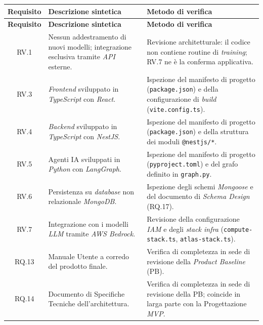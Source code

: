 \documentclass[12pt, a4paper]{article}
\begin{document}
\renewcommand{\arraystretch}{1.3}
\begin{xltabular}{\textwidth}{|c|X|X|}

    \hline
    \textbf{Requisito} & \textbf{Descrizione sintetica} & \textbf{Metodo di verifica} \\ \hline
    \endfirsthead

    \hline
    \textbf{Requisito} & \textbf{Descrizione sintetica} & \textbf{Metodo di verifica} \\ \hline
    \endhead

    RV.1 & Nessun addestramento di nuovi modelli; integrazione esclusiva tramite \textit{API} esterne. & Revisione architetturale: il codice non contiene routine di \textit{training}; RV.7 ne è la conferma applicativa. \\ \hline

    RV.3 & \textit{Frontend} sviluppato in \textit{TypeScript} con \textit{React}. & Ispezione del manifesto di progetto (\texttt{package.json}) e della configurazione di \textit{build} (\texttt{vite.config.ts}). \\ \hline

    RV.4 & \textit{Backend} sviluppato in \textit{TypeScript} con \textit{NestJS}. & Ispezione del manifesto di progetto (\texttt{package.json}) e della struttura dei moduli \texttt{@nestjs/*}. \\ \hline

    RV.5 & Agenti IA sviluppati in \textit{Python} con \textit{LangGraph}. & Ispezione del manifesto di progetto (\texttt{pyproject.toml}) e del grafo definito in \texttt{graph.py}. \\ \hline

    RV.6 & Persistenza su \textit{database} non relazionale \textit{MongoDB}. & Ispezione degli schemi \textit{Mongoose} e del documento di \textit{Schema Design} (RQ.17). \\ \hline

    RV.7 & Integrazione con i modelli \textit{LLM} tramite \textit{AWS Bedrock}. & Revisione della configurazione \textit{IAM} e degli \textit{stack infra} (\texttt{compute-stack.ts}, \texttt{atlas-stack.ts}). \\ \hline

    RQ.13 & Manuale Utente a corredo del prodotto finale. & Verifica di completezza in sede di revisione della \textit{Product Baseline} (PB). \\ \hline

    RQ.14 & Documento di Specifiche Tecniche dell'architettura. & Verifica di completezza in sede di revisione della PB; coincide in larga parte con la Progettazione \textit{MVP}. \\ \hline


\end{xltabular}
\end{document}
